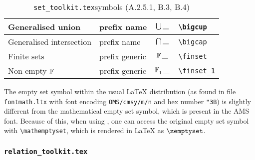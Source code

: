 \documentclass{article}
\newcommand{\emfile}[1]{\texttt{#1}}%
\newcommand{\settkfile}{\emfile{set\_toolkit.tex}}
\newcommand{\reltkfile}{\emfile{relation\_toolkit.tex}}
\newcommand{\smallcaption}[1]{{\small (#1)}}
\begin{document}
\begin{table}[ht]
\begin{tabular}{|l|l|c|l|}
   \hline
   Generalised union   & prefix name      & $\bigcup\varg$        & \verb|\bigcup| \\
   \hline
   Generalised intersection & prefix name & $\bigcap\varg$        & \verb|\bigcap| \\
   \hline
   Finite sets         & prefix generic   & $\finset\varg$        & \verb|\finset| \\
   \hline
   Non empty $\finset$ & prefix generic   & $\finset_1\varg$      & \verb|\finset_1| \\
   \hline
\end{tabular}
\caption{\settkfile symbols \smallcaption{A.2.5.1, B.3, B.4}}\label{tbl:symbol-toolkit-set}
\end{table}

The empty set symbol within the usual \LaTeX{} distribution (as found in file
\emfile{fontmath.ltx} with font encoding \verb|OMS/cmsy/m/n| and hex number \verb|"3B|)
is slightly different from the mathematical empty set symbol, which is present in the AMS font.
Because of this, when using \cztstylefile, one can access the original empty set symbol with
\verb|\mathemptyset|, which is rendered in \LaTeX{} as $\mathemptyset$.

\subsubsection{\reltkfile}\label{sec:symbol-toolkit-relation}
\end{document}
